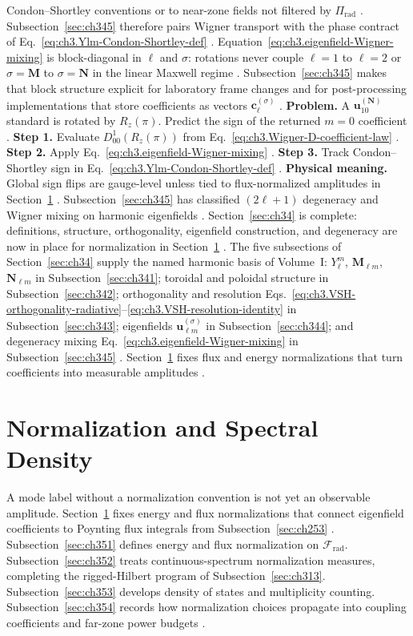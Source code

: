 Condon--Shortley conventions or to near-zone fields not filtered by \(\Pi_{\mathrm{rad}}\) \cite{hansen1988}.
Subsection~\ref{sec:ch345} therefore pairs Wigner transport with the phase contract of
Eq.~\eqref{eq:ch3.Ylm-Condon-Shortley-def} \cite{hansen1988}.
Equation~\eqref{eq:ch3.eigenfield-Wigner-mixing} is block-diagonal in \(\ell\) and \(\sigma\): rotations never couple
\(\ell=1\) to \(\ell=2\) or \(\sigma=\mathbf{M}\) to \(\sigma=\mathbf{N}\) in the linear Maxwell regime
\cite{jackson1999}. Subsection~\ref{sec:ch345} makes that block structure explicit for
laboratory frame changes and for post-processing implementations that store coefficients as vectors \(\mathbf{c}_{\ell}^{(\sigma)}\)
\cite{harrington2001}.
\textbf{Problem.} A \(\mathbf{u}_{10}^{(\mathbf{N})}\) standard is rotated by \(R_{z}(\pi)\). Predict the sign of the
returned \(m=0\) coefficient \cite{jackson1999}.
\textbf{Step 1.} Evaluate \(D_{00}^{1}(R_{z}(\pi))\) from Eq.~\eqref{eq:ch3.Wigner-D-coefficient-law} \cite{jackson1999}.
\textbf{Step 2.} Apply Eq.~\eqref{eq:ch3.eigenfield-Wigner-mixing} \cite{hansen1988}.
\textbf{Step 3.} Track Condon--Shortley sign in Eq.~\eqref{eq:ch3.Ylm-Condon-Shortley-def} \cite{hansen1988}.
\textbf{Physical meaning.} Global sign flips are gauge-level unless tied to flux-normalized amplitudes in
Section~\ref{sec:ch35} \cite{poynting1884}.
Subsection~\ref{sec:ch345} has classified \((2\ell+1)\) degeneracy and Wigner mixing on harmonic eigenfields
\cite{jackson1999}. Section~\ref{sec:ch34} is complete: definitions, structure,
orthogonality, eigenfield construction, and degeneracy are now in place for normalization in Section~\ref{sec:ch35}
\cite{stratton1941}.
The five subsections of Section~\ref{sec:ch34} supply the named harmonic basis of Volume~I:
\(Y_{\ell}^{m}\), \(\mathbf{M}_{\ell m}\), \(\mathbf{N}_{\ell m}\) in Subsection~\ref{sec:ch341}; toroidal and
poloidal structure in Subsection~\ref{sec:ch342}; orthogonality and resolution
Eqs.~\eqref{eq:ch3.VSH-orthogonality-radiative}--\eqref{eq:ch3.VSH-resolution-identity} in Subsection~\ref{sec:ch343};
eigenfields \(\mathbf{u}_{\ell m}^{(\sigma)}\) in Subsection~\ref{sec:ch344}; and degeneracy mixing
Eq.~\eqref{eq:ch3.eigenfield-Wigner-mixing} in Subsection~\ref{sec:ch345} \cite{hansen1988}.
Section~\ref{sec:ch35} fixes flux and energy normalizations that turn coefficients into measurable amplitudes
\cite{stratton1941}.
\section{Normalization and Spectral Density}
\label{sec:ch35}
A mode label without a normalization convention is not yet an observable amplitude. Section~\ref{sec:ch35}
fixes energy and flux normalizations that connect eigenfield coefficients to Poynting flux integrals from
Subsection~\ref{sec:ch253} \cite{stratton1941}. Subsection~\ref{sec:ch351} defines energy and
flux normalization on \(\mathcal{F}_{\mathrm{rad}}\). Subsection~\ref{sec:ch352} treats continuous-spectrum
normalization measures, completing the rigged-Hilbert program of Subsection~\ref{sec:ch313}. Subsection~\ref{sec:ch353}
develops density of states and multiplicity counting. Subsection~\ref{sec:ch354} records how normalization
choices propagate into coupling coefficients and far-zone power budgets \cite{harrington2001}.

